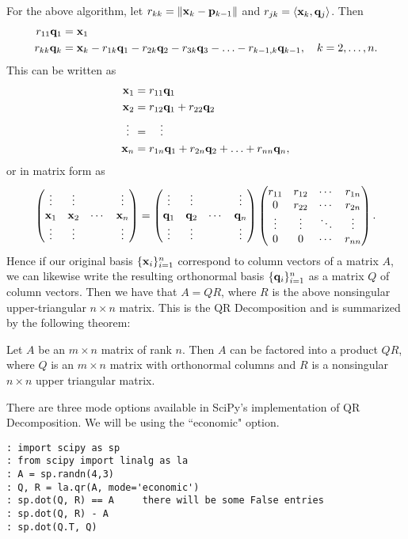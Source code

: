 For the above algorithm, let $r_{k k} = \|{\bf x}_k - {\bf p}_{k-1}\|$ and
$r_{j k} = \langle {\bf x}_k, {\bf q}_j\rangle$.  Then
\begin{align*}
r_{1 1} {\bf q}_1 &= {\bf x}_1\\
r_{k k} {\bf q}_k &= {\bf x}_k - r_{1 k} {\bf q}_1 - r_{2 k} {\bf q}_2 - r_{3 k} {\bf q}_3 -
\ldots - r_{k-1, k} {\bf q}_{k-1},\quad k=2,\ldots,n.
\end{align*}
This can be written as
\begin{align*}
{\bf x}_1 &= r_{1 1} {\bf q}_1\\
{\bf x}_2 &= r_{1 2} {\bf q}_1 + r_{2 2} {\bf q}_2\\
\vdots \:\: &= \quad \vdots\\
{\bf x}_n &= r_{1 n} {\bf q}_1 + r_{2 n} {\bf q}_2 + \ldots + r_{n n} {\bf q}_{n},
\end{align*}
or in matrix form as
\[
\begin{pmatrix}
\vdots & \vdots & & \vdots\\
{\bf x}_1 & {\bf x}_2 & \cdots & {\bf x}_n\\
\vdots & \vdots & & \vdots
\end{pmatrix}
=
\begin{pmatrix}
\vdots & \vdots & & \vdots\\
{\bf q}_1 & {\bf q}_2 & \cdots & {\bf q}_n\\
\vdots & \vdots & & \vdots
\end{pmatrix}
\begin{pmatrix}
r_{1 1} & r_{1 2} & \cdots & r_{1 n}\\
0 & r_{2 2} & \cdots & r_{2 n}\\
\vdots & \vdots & \ddots & \vdots\\
0 & 0 & \cdots & r_{n n}
\end{pmatrix}.
\]
Hence if our original basis $\{{\bf x}_i\}_{i=1}^n$ correspond to column
vectors of a matrix $A$, we can likewise write the resulting
orthonormal basis $\{{\bf q}_i\}_{i=1}^n$ as a matrix $Q$ of column
vectors.  Then we have that $A = Q R$, where $R$ is the above
nonsingular upper-triangular $n\times n$ matrix.  This is the QR
Decomposition and is summarized by the following theorem:
\vspace{5mm}
\begin{theorem}
Let $A$ be an $m\times n$ matrix of rank $n$.  Then $A$ can be
factored into a product $Q R$, where $Q$ is an $m\times n$ matrix
with orthonormal columns and $R$ is a nonsingular $n \times n$ upper
triangular matrix.
\end{theorem}


There are three mode options available in SciPy's implementation of QR Decomposition.  We will be using the ``economic" option.
\begin{lstlisting}[style=python]
: import scipy as sp
: from scipy import linalg as la
: A = sp.randn(4,3)
: Q, R = la.qr(A, mode='economic')
: sp.dot(Q, R) == A     there will be some False entries
: sp.dot(Q, R) - A
: sp.dot(Q.T, Q)
\end{lstlisting}

